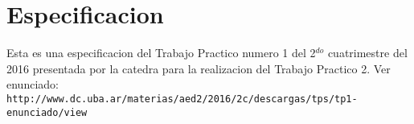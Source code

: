 \documentclass[10pt, a4paper]{article}
\begin{document}
{} %


\maketitle

\tableofcontents

\pagebreak


\section{Especificacion}
Esta es una especificacion del Trabajo Practico numero 1 del 2$^{do}$ cuatrimestre del 2016 presentada por la catedra para la realizacion del Trabajo Practico 2. Ver enunciado:\\
\verb+http://www.dc.uba.ar/materias/aed2/2016/2c/descargas/tps/tp1-enunciado/view+\\



\end{document}
